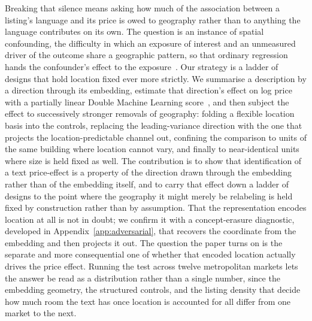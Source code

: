 \documentclass{article}
\begin{document}
Breaking that silence means asking how much of the association between a listing's language and its price is owed to geography rather than to anything the language contributes on its own. The question is an instance of spatial confounding, the difficulty in which an exposure of interest and an unmeasured driver of the outcome share a geographic pattern, so that ordinary regression hands the confounder's effect to the exposure~\citep{paciorek2010importance,hodges2010spatial}. Our strategy is a ladder of designs that hold location fixed ever more strictly. We summarise a description by a direction through its embedding, estimate that direction's effect on log price with a partially linear Double Machine Learning score~\citep{robinson1988root,chernozhukov2018double}, and then subject the effect to successively stronger removals of geography: folding a flexible location basis into the controls, replacing the leading-variance direction with the one that projects the location-predictable channel out, confining the comparison to units of the same building where location cannot vary, and finally to near-identical units where size is held fixed as well. The contribution is to show that identification of a text price-effect is a property of the direction drawn through the embedding rather than of the embedding itself, and to carry that effect down a ladder of designs to the point where the geography it might merely be relabeling is held fixed by construction rather than by assumption. That the representation encodes location at all is not in doubt; we confirm it with a concept-erasure diagnostic, developed in Appendix~\ref{app:adversarial}, that recovers the coordinate from the embedding and then projects it out. The question the paper turns on is the separate and more consequential one of whether that encoded location actually drives the price effect. Running the test across twelve metropolitan markets lets the answer be read as a distribution rather than a single number, since the embedding geometry, the structured controls, and the listing density that decide how much room the text has once location is accounted for all differ from one market to the next.
\end{document}
